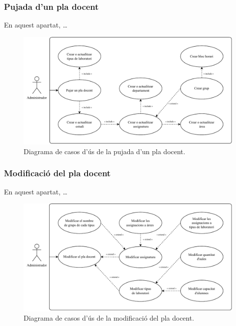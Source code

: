 \documentclass[a4paper,12pt]{ThesisStyle}
\begin{document}
\subsubsection{Pujada d'un pla docent}

En aquest apartat, \dots

\begin{figure}[H]
  \centering
  \includegraphics[width=\textwidth]{assets/use_cases/pla_docent/pujada.pdf}
  \caption{\label{img:casos_us_pla_pujada}Diagrama de casos d'ús de la pujada d'un pla docent.}
\end{figure}

\subsubsection{Modificació del pla docent}

En aquest apartat, \dots

\begin{figure}[H]
  \centering
  \includegraphics[width=\textwidth]{assets/use_cases/pla_docent/modif.pdf}
  \caption{\label{img:casos_us_pla_modif}Diagrama de casos d'ús de la modificació del pla docent.}
\end{figure}
\end{document}
